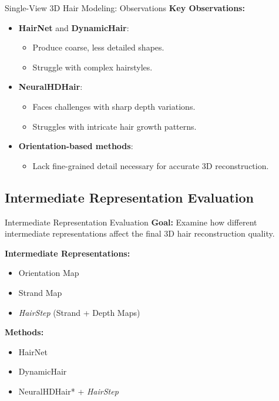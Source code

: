\begin{frame}[t]{Single-View 3D Hair Modeling: Observations}
    \textbf{Key Observations:}
    \begin{itemize}
        \item \textbf{HairNet} and \textbf{DynamicHair}:
        \begin{itemize}
            \item Produce coarse, less detailed shapes.
            \item Struggle with complex hairstyles.
        \end{itemize}
        \item \textbf{NeuralHDHair}:
        \begin{itemize}
            \item Faces challenges with sharp depth variations.
            \item Struggles with intricate hair growth patterns.
        \end{itemize}
        \item \textbf{Orientation-based methods}:
        \begin{itemize}
            \item Lack fine-grained detail necessary for accurate 3D reconstruction.
        \end{itemize}
    \end{itemize}
\end{frame}

\subsection{Intermediate Representation Evaluation}

\begin{frame}[t]{Intermediate Representation Evaluation}
    \textbf{Goal:} Examine how different intermediate representations affect the final 3D hair reconstruction quality.

    \vspace{5pt}
    \textbf{Intermediate Representations:}
    \begin{itemize}
        \item Orientation Map
        \item Strand Map
        \item \emph{HairStep} (Strand + Depth Maps)
    \end{itemize}

    \textbf{Methods:}
    \begin{itemize}
        \item HairNet~\cite{Zhou2018SingleViewHR}
        \item DynamicHair~\cite{Yang2019DynamicHM}
        \item NeuralHDHair* + \emph{HairStep}
    \end{itemize}
\end{frame}

